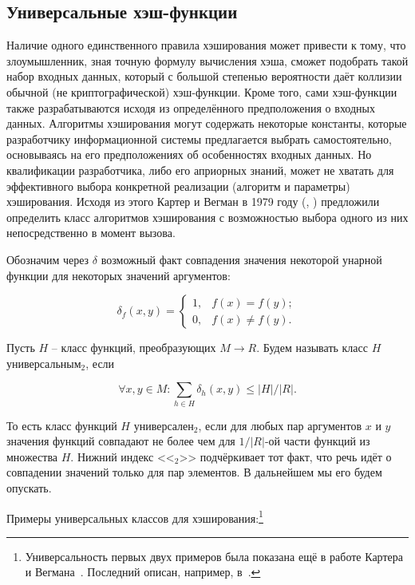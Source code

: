 \subsection{Универсальные хэш-функции}\label{sec:universal-hash-functions}
Наличие одного единственного правила хэширования может привести к тому, что злоумышленник, зная точную формулу вычисления хэша, сможет подобрать такой набор входных данных, который с большой степенью вероятности даёт коллизии обычной (не криптографической) хэш-функции. Кроме того, сами хэш-функции также разрабатываются исходя из определённого предположения о входных данных. Алгоритмы хэширования могут содержать некоторые константы, которые разработчику информационной системы предлагается выбрать самостоятельно, основываясь на его предположениях об особенностях входных данных. Но квалификации разработчика, либо его априорных знаний, может не хватать для эффективного выбора конкретной реализации (алгоритм и параметры) хэширования. Исходя из этого Картер и Вегман в 1979 году (, \cite{Carter:Wegman:1979}) предложили определить класс алгоритмов хэширования с возможностью выбора одного из них непосредственно в момент вызова.

Обозначим через $\delta$ возможный факт совпадения значения некоторой унарной функции для некоторых значений аргументов:

\[
\delta_{f}( x, y ) = \left\{\begin{matrix}
1, & f(x) = f(y);\\ 
0, & f(x) \neq f(y).
\end{matrix}\right.
\]

Пусть $H$ -- класс функций, преобразующих $M \to R$. Будем называть класс $H$ универсальным$_{2}$, если

\[
\forall x, y \in M: \sum_{h \in H} \delta_{h}( x, y ) \leq |H| / |R|.
\]

То есть класс функций $H$ универсален$_{2}$, если для любых пар аргументов $x$ и $y$ значения функций совпадают не более чем для $1/|R|$-ой части функций из множества $H$. Нижний индекс <<$_{2}$>> подчёркивает тот факт, что речь идёт о совпадении значений только для пар элементов. В дальнейшем мы его будем опускать.

Примеры универсальных классов для хэширования:\footnote{Универсальность первых двух примеров была показана ещё в работе Картера и Вегмана~\cite{Carter:Wegman:1979}. Последний описан, например, в~\cite{Dietzfelbinger:Gil:Matias:Pippenger:1992}.}


